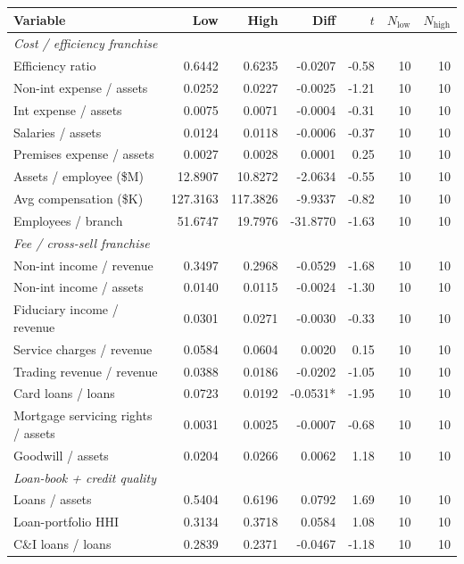 \begin{tabular}{lrrrrrr}
\toprule
Variable & Low & High & Diff & $t$ & $N_{\text{low}}$ & $N_{\text{high}}$ \\
\midrule
\multicolumn{7}{l}{\emph{Cost / efficiency franchise}} \\
\midrule
Efficiency ratio & 0.6442 & 0.6235 & -0.0207 & -0.58 & 10 & 10 \\
Non-int expense / assets & 0.0252 & 0.0227 & -0.0025 & -1.21 & 10 & 10 \\
Int expense / assets & 0.0075 & 0.0071 & -0.0004 & -0.31 & 10 & 10 \\
Salaries / assets & 0.0124 & 0.0118 & -0.0006 & -0.37 & 10 & 10 \\
Premises expense / assets & 0.0027 & 0.0028 & 0.0001 & 0.25 & 10 & 10 \\
Assets / employee (\$M) & 12.8907 & 10.8272 & -2.0634 & -0.55 & 10 & 10 \\
Avg compensation (\$K) & 127.3163 & 117.3826 & -9.9337 & -0.82 & 10 & 10 \\
Employees / branch & 51.6747 & 19.7976 & -31.8770 & -1.63 & 10 & 10 \\
\midrule
\multicolumn{7}{l}{\emph{Fee / cross-sell franchise}} \\
\midrule
Non-int income / revenue & 0.3497 & 0.2968 & -0.0529 & -1.68 & 10 & 10 \\
Non-int income / assets & 0.0140 & 0.0115 & -0.0024 & -1.30 & 10 & 10 \\
Fiduciary income / revenue & 0.0301 & 0.0271 & -0.0030 & -0.33 & 10 & 10 \\
Service charges / revenue & 0.0584 & 0.0604 & 0.0020 & 0.15 & 10 & 10 \\
Trading revenue / revenue & 0.0388 & 0.0186 & -0.0202 & -1.05 & 10 & 10 \\
Card loans / loans & 0.0723 & 0.0192 & -0.0531* & -1.95 & 10 & 10 \\
Mortgage servicing rights / assets & 0.0031 & 0.0025 & -0.0007 & -0.68 & 10 & 10 \\
Goodwill / assets & 0.0204 & 0.0266 & 0.0062 & 1.18 & 10 & 10 \\
\midrule
\multicolumn{7}{l}{\emph{Loan-book + credit quality}} \\
\midrule
Loans / assets & 0.5404 & 0.6196 & 0.0792 & 1.69 & 10 & 10 \\
Loan-portfolio HHI & 0.3134 & 0.3718 & 0.0584 & 1.08 & 10 & 10 \\
C\&I loans / loans & 0.2839 & 0.2371 & -0.0467 & -1.18 & 10 & 10 \\

\end{tabular}
